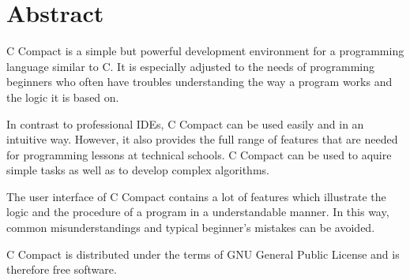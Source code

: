 

\chapter*{Abstract}



C Compact is a simple but powerful development environment for a programming language similar to C. It is especially adjusted to the needs of programming beginners who often have troubles understanding the way a program works and the logic it is based on.

In contrast to professional IDEs, C Compact can be used easily and in an intuitive way. However, it also provides the full range of features that are needed for programming lessons at technical schools. C Compact can be used to aquire simple tasks as well as to develop complex algorithms.

The user interface of C Compact contains a lot of features which illustrate the logic and the procedure of a program in a understandable manner. In this way, common misunderstandings and typical beginner's mistakes can be avoided.

C Compact is distributed under the terms of GNU General Public License and is therefore free software. 